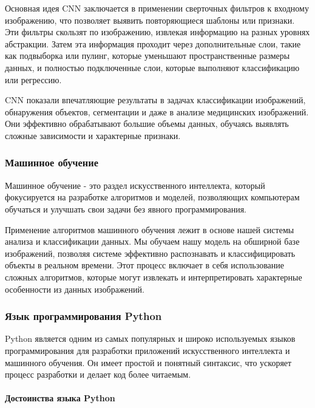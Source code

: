 Основная идея CNN заключается в применении сверточных фильтров к входному изображению, что позволяет выявить повторяющиеся шаблоны или признаки. Эти фильтры скользят по изображению, извлекая информацию на разных уровнях абстракции. Затем эта информация проходит через дополнительные слои, такие как подвыборка или пулинг, которые уменьшают пространственные размеры данных, и полностью подключенные слои, которые выполняют классификацию или регрессию.

CNN показали впечатляющие результаты в задачах классификации изображений, обнаружения объектов, сегментации и даже в анализе медицинских изображений. Они эффективно обрабатывают большие объемы данных, обучаясь выявлять сложные зависимости и характерные признаки.

\subsubsection{Машинное обучение}

Машинное обучение - это раздел искусственного интеллекта, который фокусируется на разработке алгоритмов и моделей, позволяющих компьютерам обучаться и улучшать свои задачи без явного программирования.

Применение алгоритмов машинного обучения лежит в основе нашей системы анализа и классификации данных. Мы обучаем нашу модель на обширной базе изображений, позволяя системе эффективно распознавать и классифицировать объекты в реальном времени. Этот процесс включает в себя использование сложных алгоритмов, которые могут извлекать и интерпретировать характерные особенности из данных изображений.

\subsubsection{Язык программирования Python}

Python является одним из самых популярных и широко используемых языков программирования для разработки приложений искусственного интеллекта и машинного обучения. Он имеет простой и понятный синтаксис, что ускоряет процесс разработки и делает код более читаемым.

\paragraph{Достоинства языка Python}

